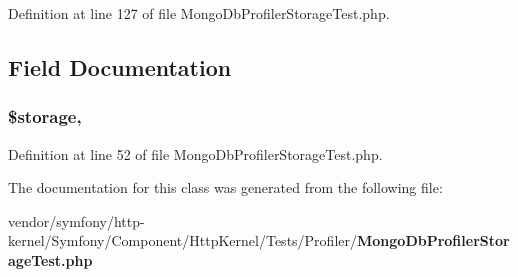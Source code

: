 Definition at line 127 of file Mongo\+Db\+Profiler\+Storage\+Test.\+php.



\subsection{Field Documentation}
\subsubsection[{\$storage}]{\setlength{\rightskip}{0pt plus 5cm}\$storage\hspace{0.3cm}{\ttfamily [static]}, {\ttfamily [protected]}}\label{class_symfony_1_1_component_1_1_http_kernel_1_1_tests_1_1_profiler_1_1_mongo_db_profiler_storage_test_a23658d9b796eebdea4cee5c9f0046894}


Definition at line 52 of file Mongo\+Db\+Profiler\+Storage\+Test.\+php.



The documentation for this class was generated from the following file\+:\begin{DoxyCompactItemize}
\item 
vendor/symfony/http-\/kernel/\+Symfony/\+Component/\+Http\+Kernel/\+Tests/\+Profiler/{\bf Mongo\+Db\+Profiler\+Storage\+Test.\+php}\end{DoxyCompactItemize}
